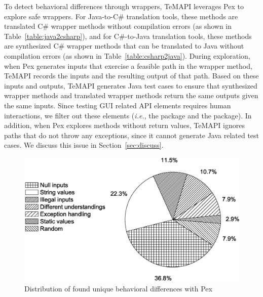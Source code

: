 To detect behavioral differences through wrappers, TeMAPI leverages Pex to explore safe wrappers. For Java-to-C\# translation tools, these methods are translated C\# wrapper methods without compilation errors (as shown in Table~\ref{table:java2csharp}), and for C\#-to-Java translation tools, these methods are synthesized C\# wrapper methods that can be translated to Java without compilation errors (as shown in Table~\ref{table:csharp2java}). During exploration, when Pex generates inputs that exercise a feasible path in the wrapper method, TeMAPI records the inputs and the resulting output of that path. Based on these inputs and outputs, TeMAPI generates Java test cases to ensure that synthesized wrapper methods and translated wrapper methods return the same outputs given the same inputs. Since testing GUI related API elements requires human interactions, we filter out these elements (\emph{i.e.}, the  package and the  package). In addition, when Pex explores methods without return values, TeMAPI ignores paths that do not throw any exceptions, since it cannot generate Java related test cases. We discuss this issue in Section~\ref{sec:discuss}.
\begin{figure}[t]
\centering
\includegraphics[scale=0.32,clip]{figure/pex-percent.eps}%
 \caption{Distribution of found unique behavioral differences with Pex}%
 \label{fig:pex-percent}
\end{figure}

